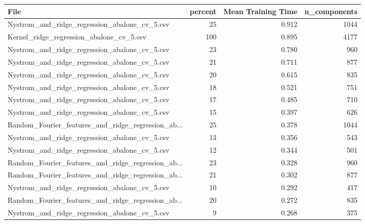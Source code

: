 \begin{tabularx}{\textwidth}{lrrr}
\toprule
                                              File &  percent &  Mean Training Time &  n\_components \\
\midrule
     Nystrom\_and\_ridge\_regression\_abalone\_cv\_5.csv &       25 &               0.912 &          1044 \\
          Kernel\_ridge\_regression\_abalone\_cv\_5.csv &      100 &               0.895 &          4177 \\
     Nystrom\_and\_ridge\_regression\_abalone\_cv\_5.csv &       23 &               0.780 &           960 \\
     Nystrom\_and\_ridge\_regression\_abalone\_cv\_5.csv &       21 &               0.711 &           877 \\
     Nystrom\_and\_ridge\_regression\_abalone\_cv\_5.csv &       20 &               0.615 &           835 \\
     Nystrom\_and\_ridge\_regression\_abalone\_cv\_5.csv &       18 &               0.521 &           751 \\
     Nystrom\_and\_ridge\_regression\_abalone\_cv\_5.csv &       17 &               0.485 &           710 \\
     Nystrom\_and\_ridge\_regression\_abalone\_cv\_5.csv &       15 &               0.397 &           626 \\
Random\_Fourier\_features\_and\_ridge\_regression\_ab... &       25 &               0.378 &          1044 \\
     Nystrom\_and\_ridge\_regression\_abalone\_cv\_5.csv &       13 &               0.356 &           543 \\
     Nystrom\_and\_ridge\_regression\_abalone\_cv\_5.csv &       12 &               0.344 &           501 \\
Random\_Fourier\_features\_and\_ridge\_regression\_ab... &       23 &               0.328 &           960 \\
Random\_Fourier\_features\_and\_ridge\_regression\_ab... &       21 &               0.302 &           877 \\
     Nystrom\_and\_ridge\_regression\_abalone\_cv\_5.csv &       10 &               0.292 &           417 \\
Random\_Fourier\_features\_and\_ridge\_regression\_ab... &       20 &               0.272 &           835 \\
     Nystrom\_and\_ridge\_regression\_abalone\_cv\_5.csv &        9 &               0.268 &           375 \\

\end{tabularx}
